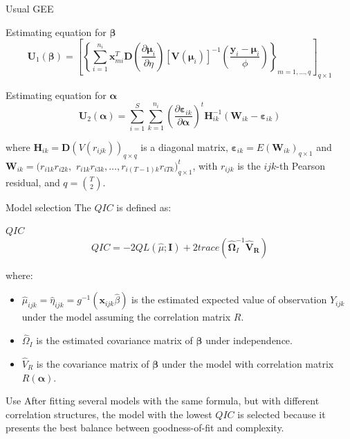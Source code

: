 \documentclass[t,9pt]{beamer}
\begin{document}
\begin{frame}[fragile]{Usual GEE}
 \begin{block}{Estimating equation for $\pmb{\beta}$}
     \begin{equation}\nonumber
        \pmb{U}_1(\pmb{\beta})=\left[ \left\{\sum_{i=1}^{n_i} \pmb{x}_{mi}^T \pmb{D}\left( \frac{\partial \pmb{\mu}_i}{\partial\eta}\right) [\pmb{V}(\pmb{\mu}_i)]^{-1}\left(\frac{\pmb{y}_{i}- \pmb{\mu}_i}{\phi} \right) \right\}_{m=1, \ldots, q} \right]_{q\times 1} 
     \end{equation}
 \end{block}
 \begin{block}{Estimating equation for $\pmb{\alpha}$}
     \begin{equation}\nonumber
        \pmb{U}_2(\pmb{ \alpha})=\sum_{i=1}^S \sum_{k=1}^{n_i}\left(\frac{\partial \pmb{\varepsilon}_{ik}}{\partial \pmb{ \alpha}} \right)^t \pmb{H}_{ik}^{-1} \left(\pmb{W}_{ik} - \pmb{\varepsilon}_{ik} \right)
     \end{equation}
 \end{block}
 where $\pmb{H}_{ik}=\pmb{D}(V(r_{ijk}))_{q\times q}$ is a diagonal matrix, $\pmb{\varepsilon}_{ik}=E(\pmb{W}_{ik})_{q\times 1}$ and 
$\pmb{W}_{ik}= (r_{i1k}r_{i2k},$ $r_{i1k}r_{i3k},\ldots,r_{i(T-1)k}r_{iTk})^t_{q\times 1}$, with $r_{ijk}$ is the  $ijk$-th Pearson residual, and  $q={T \choose 2}$.
\end{frame}
\begin{frame}[fragile]{Model selection}
 The $QIC$ is defined as:
 \begin{block}{$QIC$}
     \begin{equation}\nonumber
       QIC=-2QL(\hat{\mu};\pmb{I})+2trace(\pmb{\hat{\Omega}}^{-1}_I\pmb{\hat{V}_R})
     \end{equation}
 \end{block}
where:
\begin{itemize}
    \item $\hat{\mu}_{ijk}=\hat{\eta}_{ijk}=g^{-1}(\pmb{x}_{ijk}\hat{\beta})$ is the estimated expected value of observation $Y_{ijk}$  under the model assuming the correlation matrix $R$.
    \item  $\hat{\Omega}_I$ is the estimated covariance matrix of $\pmb{\beta}$ under independence.
    \item $\hat{V}_R$ is the covariance matrix of  $\pmb{\beta}$ under the model with correlation matrix   $R(\pmb{ \alpha})$.
\end{itemize}
\begin{block}{Use}
    After fitting several models with the same formula, but with different correlation structures, the model with the lowest $QIC$ is selected because it presents the best balance between goodness-of-fit and complexity.
\end{block}
\end{frame}
\end{document}
